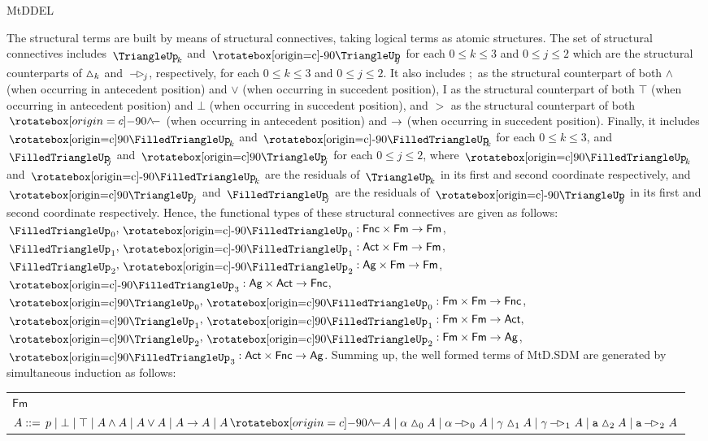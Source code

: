 \begin{entry}{MtDDEL}
\begin{clarifications}
  The structural terms are built by means of structural connectives, taking
  logical terms as atomic structures. The set of structural connectives includes
  $\mAND_{\!\!k}$ and $ \mRA_{\!\!\!\!j}$ for each $0\leq k\leq 3$  and  $0\leq
  j\leq 2$ which are the structural counterparts of $\vartriangle_k$ and $ \mbox{$\,-{\mkern-3mu\vartriangleright}\,$}_{\!\!j}$,
  respectively, for each $0\leq k\leq 3$ and  $0\leq j\leq 2$.  It also includes
  $;$ as the structural counterpart of both $\wedge$ (when occurring in antecedent
  position) and $\vee$ (when occurring in succedent position), $\mathrm{I}$ as the
  structural counterpart of both $\top$ (when occurring in antecedent position)
  and $\bot$ (when occurring in succedent position), and $>$ as the structural
  counterpart of both $\pdra$ (when occurring in antecedent position) and $\rightarrow$
  (when occurring in succedent position). Finally, it includes  $\mBLA_{\!\!k}$
  and $\mBRA_{\!\!\!k}$ for each $0\leq k\leq 3$, and $\mBAND_{\!\!\!j}$ and
  $\mLA_{\!\!\!j}$ for each $0\leq j\leq 2$, where $\mBLA_{\!\!k}$ and
  $\mBRA_{\!\!k}$ are the residuals of $\mAND_{\!\!k}$ in its first and  second
  coordinate respectively, and $\mLA_{\!\!j}$ and $\mBAND_{\!\!\!j}$ are the
  residuals of $\mRA_{\!\!\!\!j}$ in its first and second  coordinate
  respectively. Hence, the functional types of these structural connectives are
  given as follows:
  ${\mBAND}_{\!0}, {\mBRA}_{\! 0}   :  \mathsf{Fnc} \times \mathsf{Fm} \to \mathsf{Fm}$, 
  ${\mBAND}_{\!1}, {\mBRA}_{\! 1}  :  \mathsf{Act} \times \mathsf{Fm} \to \mathsf{Fm}$, 
  ${\mBAND}_{\!2}, {\mBRA}_{\! 2}  : \mathsf{Ag} \times \mathsf{Fm} \to \mathsf{Fm}$, 
  ${\mBRA}_{\! 3}  :  \mathsf{Ag} \times \mathsf{Act} \to \mathsf{Fnc}$,
  ${\mLA}_{\! 0} , {\mBLA}_{\! 0} : \mathsf{Fm}  \times \mathsf{Fm} \to \mathsf{Fnc}$,
  ${\mLA}_{\! 1} , {\mBLA}_{\! 1} :  \mathsf{Fm}  \times \mathsf{Fm} \to \mathsf{Act},$
  ${\mLA}_{\! 2} , {\mBLA}_{\! 2} : \mathsf{Fm}\times \mathsf{Fm} \to \mathsf{Ag}$,
  ${\mBLA}_{\! 3} :  \mathsf{Act} \times \mathsf{Fnc} \to \mathsf{Ag}$.
  Summing up, the well formed terms of MtD.SDM are generated by simultaneous
  induction as follows:
  {\small
  \begin{center}
  \begin{tabular}{@{}l@{}}
  $\mathsf{Fm}$ \\
  $A:: = \, p \mid \bot \mid \top \mid A \wedge A \mid A \vee A \mid A \rightarrow A 
         \mid A \pdra A \mid \alpha\mand_0 A \mid \alpha\mra_{\! 0} \  A 
         \mid \gamma\mand_1 A\mid \gamma\mra_{\! 1} \  A \mid \aga \mand_2 A \mid \aga\mra_{\! 2} \  A$ \\

\end{tabular}
\end{center}}
\end{clarifications}
\end{entry}
